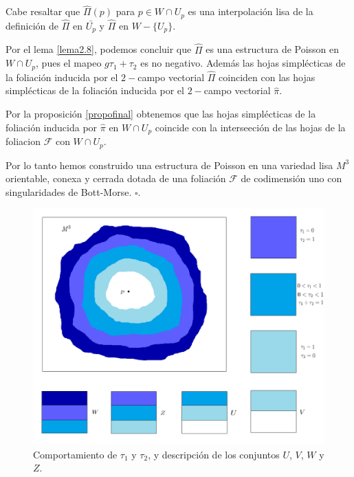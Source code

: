 \documentclass[a4paper,10pt]{book}
\begin{document}
Cabe resaltar que $\hat{\Pi}(p)$ para $p\in W\cap U_{p}$ es una interpolaci\'on lisa de la definici\'on de $\hat{\Pi}$ en $\bar{U_{p}}$ y $\hat{\Pi}$ en $W-\{U_{p}\}$.
\vspace{5mm}

Por el lema \ref{lema2.8}, podemos concluir que $\hat{\Pi}$ es una estructura de Poisson en $W\cap U_{p}$, pues el mapeo $g\tau_{1}+\tau_{2}$ es no negativo. Adem\'as las hojas simpl\'ecticas de la foliaci\'on inducida por el $2-$campo vectorial $\hat{\Pi}$ coinciden con las hojas simpl\'ecticas de la foliaci\'on inducida por el $2-$campo vectorial $\hat{\pi}.$
\vspace{5mm}

Por la proposici\'on \ref{propofinal} obtenemos que las hojas simpl\'ecticas de la foliaci\'on inducida por $\hat{\pi}$ en $W\cap U_{p}$ coincide con la interseeci\'on de las hojas de la foliacion $\mathcal{F}$ con $W\cap U_{p}$. 
\vspace{5mm}

Por lo tanto hemos construido una estructura de Poisson en una variedad lisa $M^{3}$ orientable, conexa y cerrada dotada de una foliaci\'on $\mathcal{F}$ de codimensi\'on uno con singularidades de Bott-Morse. \hfill $\square$.

\begin{figure}[!ht]
\centering
\includegraphics[scale=0.45]{imagenfinal.png}
\caption{Comportamiento de $\tau_{1}$ y $\tau_{2}$, y descripci\'on de los conjuntos $U$, $V$, $W$ y $Z$.}
\label{final}
\end{figure}
\end{document}
